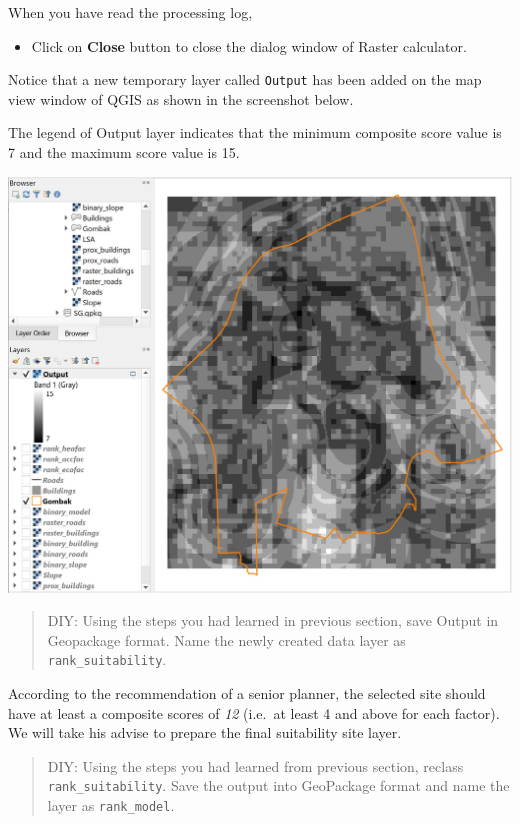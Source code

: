 \documentclass[
  letterpaper,
  DIV=11,
  numbers=noendperiod]{scrreprt}
\providecommand{\tightlist}{%
  \setlength{\itemsep}{0pt}\setlength{\parskip}{0pt}}\usepackage{longtable,booktabs,array}
\begin{document}
When you have read the processing log,

\begin{itemize}
\tightlist
\item
  Click on \textbf{Close} button to close the dialog window of Raster
  calculator.
\end{itemize}

Notice that a new temporary layer called \texttt{Output} has been added
on the map view window of QGIS as shown in the screenshot below.

The legend of Output layer indicates that the minimum composite score
value is 7 and the maximum score value is 15.

\includegraphics{./img08/image10.jpg}

\begin{quote}
DIY: Using the steps you had learned in previous section, save Output in
Geopackage format. Name the newly created data layer as
\texttt{rank\_suitability}.
\end{quote}

According to the recommendation of a senior planner, the selected site
should have at least a composite scores of \emph{12} (i.e.~at least 4
and above for each factor). We will take his advise to prepare the final
suitability site layer.

\begin{quote}
DIY: Using the steps you had learned from previous section, reclass
\texttt{rank\_suitability}. Save the output into GeoPackage format and
name the layer as \texttt{rank\_model}.
\end{quote}
\end{document}
